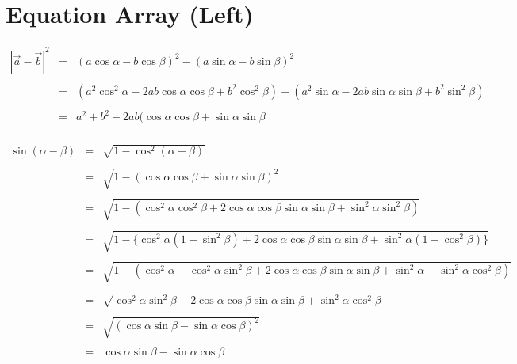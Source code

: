 \documentclass[a4paper]{article}
\begin{document}
\Large

\section{Equation Array (Left)}

\begin{comment}
$\begin{array}{rcl}
	
\end{array}
\end{comment}

$\begin{array}{rcl}
	| \vec{a} - \vec{b} |^2  & = & (a \cos \alpha - b \cos \beta)^2 - (a \sin \alpha - b \sin \beta)^2 \\
\\
	& = & ( a^2\cos^2\alpha - 2ab \cos\alpha\cos\beta + b^2\cos^2\beta) + (a^2\sin\alpha - 2ab\sin\alpha\sin\beta + b^2\sin^2\beta) \\
\\
	& = & a^2 + b^2 - 2ab(\cos\alpha\cos\beta+\sin\alpha\sin\beta
\end{array}
$\\\\

$
\begin{array}{rcl}
\sin(\alpha-\beta) & = & \sqrt{1-\cos^2(\alpha-\beta)} \\\\
& = & \sqrt{1-(\cos\alpha\cos\beta+\sin\alpha\sin\beta)^2} \\\\
& = & \sqrt{1-(\cos^2\alpha\cos^2\beta+2\cos\alpha\cos\beta\sin\alpha\sin\beta+\sin^2\alpha\sin^2\beta)} \\\\
& = & \sqrt{1-\{\cos^2\alpha(1-\sin^2\beta)+2\cos\alpha\cos\beta\sin\alpha\sin\beta+\sin^2\alpha(1-\cos^2\beta)\}} \\\\
& = & \sqrt{1-(\cos^2\alpha-\cos^2\alpha\sin^2\beta+2\cos\alpha\cos\beta\sin\alpha\sin\beta+\sin^2\alpha-\sin^2\alpha\cos^2\beta)} \\\\
& = & \sqrt{\cos^2\alpha\sin^2\beta-2\cos\alpha\cos\beta\sin\alpha\sin\beta+\sin^2\alpha\cos^2\beta} \\\\
& = & \sqrt{(\cos\alpha\sin\beta-\sin\alpha\cos\beta)^2} \\\\
& = & \cos\alpha\sin\beta-\sin\alpha\cos\beta
\end{array}	
$
\\\\
\end{document}
